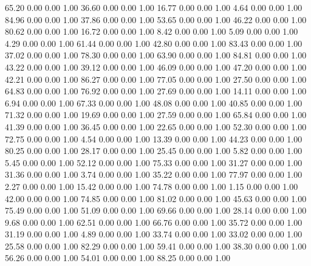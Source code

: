    65.20   0.00   0.00   1.00
   36.60   0.00   0.00   1.00
   16.77   0.00   0.00   1.00
    4.64   0.00   0.00   1.00
   84.96   0.00   0.00   1.00
   37.86   0.00   0.00   1.00
   53.65   0.00   0.00   1.00
   46.22   0.00   0.00   1.00
   80.62   0.00   0.00   1.00
   16.72   0.00   0.00   1.00
    8.42   0.00   0.00   1.00
    5.09   0.00   0.00   1.00
    4.29   0.00   0.00   1.00
   61.44   0.00   0.00   1.00
   42.80   0.00   0.00   1.00
   83.43   0.00   0.00   1.00
   37.02   0.00   0.00   1.00
   78.30   0.00   0.00   1.00
   63.90   0.00   0.00   1.00
   84.81   0.00   0.00   1.00
   43.22   0.00   0.00   1.00
   39.12   0.00   0.00   1.00
   46.09   0.00   0.00   1.00
   47.20   0.00   0.00   1.00
   42.21   0.00   0.00   1.00
   86.27   0.00   0.00   1.00
   77.05   0.00   0.00   1.00
   27.50   0.00   0.00   1.00
   64.83   0.00   0.00   1.00
   76.92   0.00   0.00   1.00
   27.69   0.00   0.00   1.00
   14.11   0.00   0.00   1.00
    6.94   0.00   0.00   1.00
   67.33   0.00   0.00   1.00
   48.08   0.00   0.00   1.00
   40.85   0.00   0.00   1.00
   71.32   0.00   0.00   1.00
   19.69   0.00   0.00   1.00
   27.59   0.00   0.00   1.00
   65.84   0.00   0.00   1.00
   41.39   0.00   0.00   1.00
   36.45   0.00   0.00   1.00
   22.65   0.00   0.00   1.00
   52.30   0.00   0.00   1.00
   72.75   0.00   0.00   1.00
    4.54   0.00   0.00   1.00
   13.39   0.00   0.00   1.00
   44.23   0.00   0.00   1.00
   80.25   0.00   0.00   1.00
   28.17   0.00   0.00   1.00
   25.45   0.00   0.00   1.00
    5.82   0.00   0.00   1.00
    5.45   0.00   0.00   1.00
   52.12   0.00   0.00   1.00
   75.33   0.00   0.00   1.00
   31.27   0.00   0.00   1.00
   31.36   0.00   0.00   1.00
    3.74   0.00   0.00   1.00
   35.22   0.00   0.00   1.00
   77.97   0.00   0.00   1.00
    2.27   0.00   0.00   1.00
   15.42   0.00   0.00   1.00
   74.78   0.00   0.00   1.00
    1.15   0.00   0.00   1.00
   42.00   0.00   0.00   1.00
   74.85   0.00   0.00   1.00
   81.02   0.00   0.00   1.00
   45.63   0.00   0.00   1.00
   75.49   0.00   0.00   1.00
   51.09   0.00   0.00   1.00
   69.66   0.00   0.00   1.00
   28.14   0.00   0.00   1.00
    9.68   0.00   0.00   1.00
   62.51   0.00   0.00   1.00
   66.76   0.00   0.00   1.00
   35.72   0.00   0.00   1.00
   31.19   0.00   0.00   1.00
    4.89   0.00   0.00   1.00
   33.74   0.00   0.00   1.00
   33.02   0.00   0.00   1.00
   25.58   0.00   0.00   1.00
   82.29   0.00   0.00   1.00
   59.41   0.00   0.00   1.00
   38.30   0.00   0.00   1.00
   56.26   0.00   0.00   1.00
   54.01   0.00   0.00   1.00
   88.25   0.00   0.00   1.00
